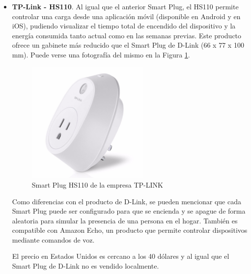 \begin{itemize}
\item \textbf{TP-Link - HS110}. Al igual que el anterior Smart Plug, el HS110 permite controlar una carga desde una aplicación móvil (disponible en Android y en iOS), pudiendo visualizar el tiempo total de encendido del dispositivo y la energía consumida tanto actual como en las semanas previas. Este producto ofrece un gabinete más reducido que el Smart Plug de D-Link (66 x 77 x 100 mm). Puede verse una fotografía del mismo en la Figura \ref{fig:smartplug_tplink}.

\begin{figure}[h]
	\centering
	\includegraphics[width=6cm]{./Figures/1_2_TP-LINK-HS110.png}
	\caption{Smart Plug HS110 de la empresa TP-LINK}
	\label{fig:smartplug_tplink}
\end{figure}

Como diferencias con el producto de D-Link, se pueden mencionar que cada Smart Plug puede ser configurado para que se encienda y se apague de forma aleatoria para simular la presencia de una persona en el hogar. También es compatible con Amazon Echo, un producto que permite controlar dispositivos mediante comandos de voz.

El precio en Estados Unidos es cercano a los 40 dólares y al igual que el Smart Plug de D-Link no es vendido localmente.

\end{itemize}


